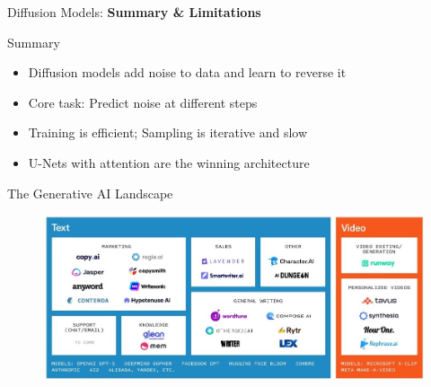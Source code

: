 \begin{frame}{}
    \LARGE Diffusion Models: \textbf{Summary \& Limitations}
\end{frame}

\begin{frame}{Summary}
    \begin{itemize}
        \item Diffusion models add noise to data and learn to reverse it
        \item Core task: Predict noise at different steps
        \item Training is efficient; Sampling is iterative and slow
        \item U-Nets with attention are the winning architecture
    \end{itemize}
\end{frame}


\begin{frame}{The Generative AI Landscape}
\begin{figure}
    \centering
    \includegraphics[height=0.9\textheight, width=1.05\textwidth, keepaspectratio]{images/diffusion/gen_ai_landscape.jpg}
\end{figure}
\end{frame}

